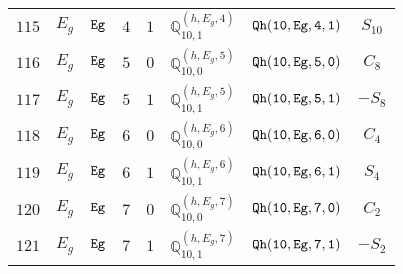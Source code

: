 \documentclass[fleqn,8pt]{jsarticle}
\begin{document}
\begin{table}[ht!]
\begin{center}
\begin{tabular}{cccccccc}
$ 115 $ & $ E_{g} $ & $ {\tt Eg} $ & $ 4 $ & $ 1 $ & $ \mathbb{Q}_{10,1}^{(h,E_{g},4)} $ & $ {\tt Qh(10,Eg,4,1)} $ & $ S_{10} $ \\
$ 116 $ & $ E_{g} $ & $ {\tt Eg} $ & $ 5 $ & $ 0 $ & $ \mathbb{Q}_{10,0}^{(h,E_{g},5)} $ & $ {\tt Qh(10,Eg,5,0)} $ & $ C_{8} $ \\
$ 117 $ & $ E_{g} $ & $ {\tt Eg} $ & $ 5 $ & $ 1 $ & $ \mathbb{Q}_{10,1}^{(h,E_{g},5)} $ & $ {\tt Qh(10,Eg,5,1)} $ & $ - S_{8} $ \\
$ 118 $ & $ E_{g} $ & $ {\tt Eg} $ & $ 6 $ & $ 0 $ & $ \mathbb{Q}_{10,0}^{(h,E_{g},6)} $ & $ {\tt Qh(10,Eg,6,0)} $ & $ C_{4} $ \\
$ 119 $ & $ E_{g} $ & $ {\tt Eg} $ & $ 6 $ & $ 1 $ & $ \mathbb{Q}_{10,1}^{(h,E_{g},6)} $ & $ {\tt Qh(10,Eg,6,1)} $ & $ S_{4} $ \\
$ 120 $ & $ E_{g} $ & $ {\tt Eg} $ & $ 7 $ & $ 0 $ & $ \mathbb{Q}_{10,0}^{(h,E_{g},7)} $ & $ {\tt Qh(10,Eg,7,0)} $ & $ C_{2} $ \\
$ 121 $ & $ E_{g} $ & $ {\tt Eg} $ & $ 7 $ & $ 1 $ & $ \mathbb{Q}_{10,1}^{(h,E_{g},7)} $ & $ {\tt Qh(10,Eg,7,1)} $ & $ - S_{2} $ \\
 \hline \hline
\end{tabular}
\end{center}
\end{table}
\end{document}
